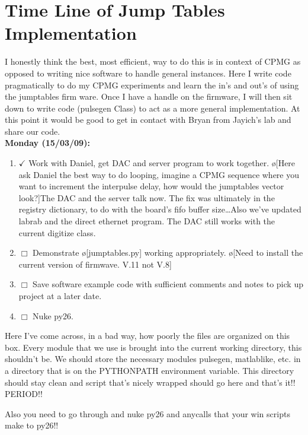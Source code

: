 \documentclass[10pt]{book}
\begin{document}
\section{Time Line of Jump Tables Implementation}

I honestly think the best, most efficient, way to do this is in context of CPMG as opposed to writing nice software to handle general instances. Here I write code pragmatically to do my CPMG experiments and learn the in's and out's of using the jumptables firm ware. Once I have a handle on the firmware, I will then sit down to write code (pulsegen Class) to act as a more general implementation. At this point it would be good to get in contact with Bryan from Jayich's lab and share our code. \\

{\bf Monday (15/03/09):}
\begin{enumerate}
    \item $\checkmark$ Work with Daniel, get DAC and server program to work together. \o[Here ask Daniel the best way to do looping, imagine a CPMG sequence where you want to increment the interpulse delay, how would the jumptables vector look?]{The DAC and the server talk now. The fix was ultimately in the registry dictionary, to do with the board's fifo buffer size\ldots Also we've updated labrab and the direct ethernet program. The DAC still works with the current digitize class.} 
    \item $\Box$ Demonstrate \o[jumptables.py]{} working appropriately. \o[Need to install the current version of firmwave. V.11 not V.8]{}
    \item $\Box$ Save software example code with sufficient comments and notes to pick up project at a later date. \\
    \item $\Box$ Nuke py26.
\end{enumerate} 
Here I've come across, in a bad way, how poorly the files are organized on this box. Every module that we use is brought into the current working directory, this shouldn't be. We should store the necessary modules pulsegen, matlablike, etc. in a directory that is on the PYTHONPATH environment variable. This directory should stay clean and script that's nicely wrapped should go here and that's it!! PERIOD!!

Also you need to go through and nuke py26 and anycalls that your win scripts make to py26!! \\ \\
\end{document}
